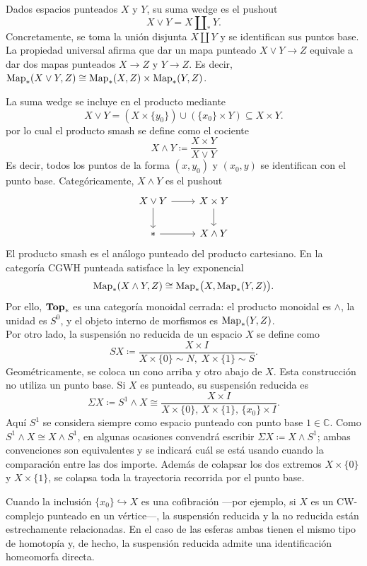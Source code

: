Dados espacios punteados \(X\) y \(Y\), su suma wedge es el pushout
\[
X\vee Y=X\amalg_*Y.
\]
Concretamente, se toma la unión disjunta \(X\amalg Y\) y se identifican sus puntos base. La propiedad universal afirma que dar un mapa punteado \(X\vee Y\longrightarrow Z\) equivale a dar dos mapas punteados \(X\to Z\) y \(Y\to Z\). Es decir, $\operatorname{Map}_*(X \vee Y, Z) \cong \operatorname{Map}_*(X, Z) \times\operatorname{Map}_*(Y, Z)$.

La suma wedge se incluye en el producto mediante
\[
X\vee Y=(X\times\{y_0\})\cup(\{x_0\}\times Y)\subseteq X\times Y.
\]
por lo cual el producto smash se define como el cociente
\[
X\wedge Y\coloneqq \frac{X\times Y}{X\vee Y}
\]
Es decir, todos los puntos de la forma \((x,y_0)\) y \((x_0,y)\) se identifican con el punto base. Categóricamente, \(X\wedge Y\) es el pushout
\[
\begin{tikzcd}
X\vee Y \arrow[r] \arrow[d] & X\times Y \arrow[d]\\
* \arrow[r] & X\wedge Y
\end{tikzcd}
\]
El producto smash es el análogo punteado del producto cartesiano. En la categoría CGWH punteada satisface la ley exponencial
\[
\operatorname{Map}_*(X\wedge Y,Z)\cong \operatorname{Map}_*\bigl(X,\operatorname{Map}_*(Y,Z)\bigr).
\]
Por ello, \(\mathbf{Top}_*\) es una categoría monoidal cerrada: el producto monoidal es \(\wedge\), la unidad es \(S^0\), y el objeto interno de morfismos es \(\operatorname{Map}_*(Y,Z)\).
\\
Por otro lado, la suspensión no reducida de un espacio \(X\) se define como
\[
SX\coloneqq \frac{X\times I}{X\times\{0\}\sim N,\;X\times\{1\}\sim S}.
\]
Geométricamente, se coloca un cono arriba y otro abajo de \(X\). Esta construcción no utiliza un punto base.
Si \(X\) es punteado, su suspensión reducida es
\[
\Sigma X\coloneqq S^1\wedge X \cong \frac{X\times I}{X\times\{0\},\,X\times\{1\},\,\{x_0\}\times I}.
\]
Aquí \(S^1\) se considera siempre como espacio punteado con punto base \(1\in\mathbb C\). Como \(S^1\wedge X\cong X\wedge S^1\), en algunas ocasiones convendrá escribir \(\Sigma X\coloneqq X\wedge S^1\); ambas convenciones son equivalentes y se indicará cuál se está usando cuando la comparación entre las dos importe.
Además de colapsar los dos extremos \(X\times\{0\}\) y \(X\times\{1\}\), se colapsa toda la trayectoria recorrida por el punto base.

Cuando la inclusión \(\{x_0\}\hookrightarrow X\) es una cofibración ---por ejemplo, si \(X\) es un CW-complejo punteado en un vértice---, la suspensión reducida y la no reducida están estrechamente relacionadas. En el caso de las esferas ambas tienen el mismo tipo de homotopía y, de hecho, la suspensión reducida admite una identificación homeomorfa directa.

